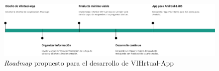 \begin{figure}[htbp]
\centering
\includegraphics[scale=0.4]{../images/roadmap.png} 
\caption{\textit{Roadmap} propuesto para el desarrollo de VIHrtual-App}
\label{fig:roadmap desarrollo}
\end{figure}


